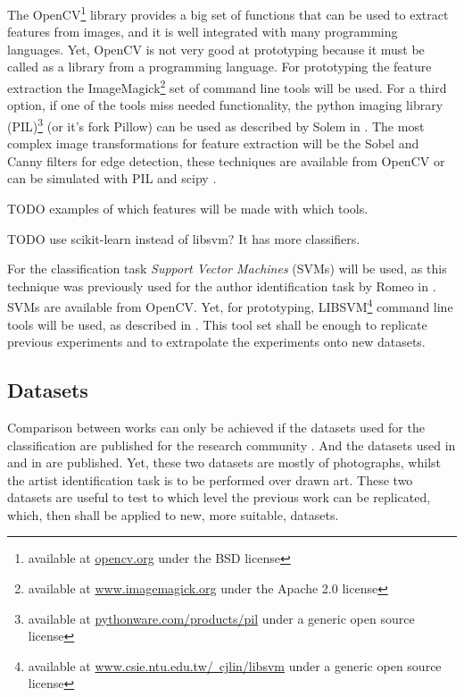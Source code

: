 \documentclass[a4paper]{article}
\begin{document}
The OpenCV\footnote{available at \href{http://opencv.org/}{opencv.org} under
the BSD license} library provides a big set of functions that can be used to
extract features from images, and it is well integrated with many programming
languages.  Yet, OpenCV is not very good at prototyping because it must be
called as a library from a programming language.  For prototyping the feature
extraction the ImageMagick\footnote{available at
\href{http://www.imagemagick.org/}{www.imagemagick.org} under the Apache 2.0
license} set of command line tools will be used.  For a third option, if one of
the tools miss needed functionality, the python imaging library
(PIL)\footnote{available at
\href{http://pythonware.com/products/pil/}{pythonware.com/products/pil} under a
generic open source license} (or it's fork Pillow) can be used as described by
Solem in \cite{solem12book}.  The most complex image transformations for
feature extraction will be the Sobel and Canny filters for edge detection,
these techniques are available from OpenCV or can be simulated with PIL and
scipy \cite{oliphant06numpy}.

TODO examples of which features will be made with which tools.

TODO use scikit-learn instead of libsvm?  It has more classifiers.

For the classification task \emph{Support Vector Machines }(SVMs) will be used,
as this technique was previously used for the author identification task by
Romeo in \cite{rmc12ajs}.  SVMs are available from OpenCV.  Yet, for
prototyping, LIBSVM\footnote{available at
\href{http://www.csie.ntu.edu.tw/~cjlin/libsvm/}
{www.csie.ntu.edu.tw/~cjlin/libsvm} under a generic open source license}
command line tools will be used, as described in \cite{hcl03svm}.  This tool
set shall be enough to replicate previous experiments and to extrapolate the
experiments onto new datasets.

\subsection{Datasets}

Comparison between works can only be achieved if the datasets used for the
classification are published for the research community \cite{mach10clas}.  And
the datasets used in \cite{mach10clas} and in \cite{jma12clas} are published.
Yet, these two datasets are mostly of photographs, whilst the artist
identification task is to be performed over drawn art.  These two datasets are
useful to test to which level the previous work can be replicated, which, then
shall be applied to new, more suitable, datasets.
\end{document}

